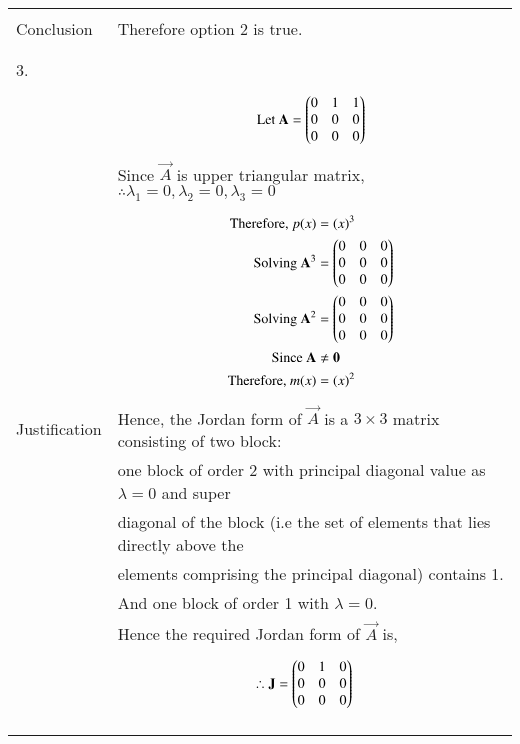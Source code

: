 \documentclass[journal,12pt]{IEEEtran}
\begin{document}
\begin{longtable}{|l|l|}
&\\
\hline
&\\
Conclusion&Therefore option 2 is true.\\
&\\
\hline
\pagebreak
\hline
&\\
3.&\\
&\parbox{6cm}{\begin{align*}
    \mbox{Let }\mathbf{A}&=\begin{pmatrix}0&1&1\\0&0&0\\0&0&0\end{pmatrix}\\
\end{align*}}\\
&Since $\vec{A}$ is upper triangular matrix, $\therefore \lambda_{1}=0,\lambda_{2}=0,\lambda_{3}=0$ \\
&\parbox{6cm}{\begin{align*}
    \mbox{Therefore, }p(x)&=(x)^3\\
    \mbox{Solving }\mathbf{A}^3&=\begin{pmatrix}0&0&0\\0&0&0\\0&0&0\end{pmatrix}\\
    \mbox{Solving }\mathbf{A}^2&=\begin{pmatrix}0&0&0\\0&0&0\\0&0&0\end{pmatrix}\\
    \mbox{Since }\mathbf{A}&\neq \mathbf{0}\\
    \mbox{Therefore, }m(x)&=(x)^2\\
    \end{align*}}\\
Justification&Hence, the Jordan form of $\vec{A}$ is a $3 \times 3$ matrix consisting of two block:\\
&one block of order 2 with principal diagonal value as $\lambda = 0$ and super\\
&diagonal of the block (i.e the set of elements that lies directly above the\\
&elements comprising the principal diagonal) contains 1.\\
&And one block of order 1 with $\lambda=0$.\\
&Hence the required Jordan form of $\vec{A}$ is,\\
&\parbox{6cm}{\begin{align*}
    \therefore \mathbf{J}&=\begin{pmatrix}0&1&0\\0&0&0\\0&0&0\end{pmatrix}
\end{align*}}\\
&\\
\hline
&\\

\end{longtable}
\end{document}
